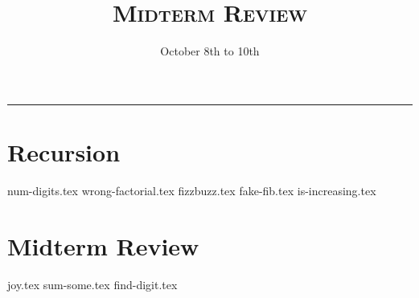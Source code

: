 \documentclass{exam}
\title{\textsc{Midterm Review}}
\date{October 8th to 10th}
\begin{document}
\maketitle
\rule{\textwidth}{0.15em}
\fontsize{12}{15}\selectfont


\section{Recursion}
\begin{questions}
{num-digits.tex}
{wrong-factorial.tex}
{fizzbuzz.tex}
{fake-fib.tex}
{is-increasing.tex}



\section{Midterm Review}
{joy.tex}
{sum-some.tex}
{find-digit.tex}



\end{questions}
\end{document}
